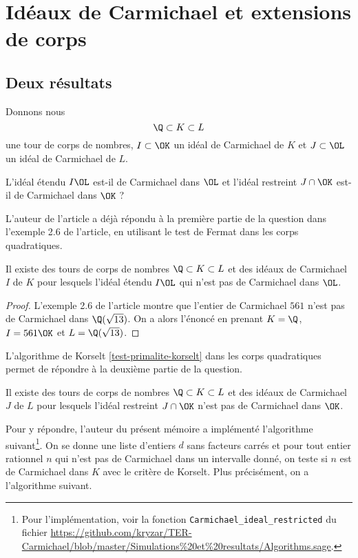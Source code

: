 \section{Idéaux de Carmichael et extensions de corps}

\subsection{Deux résultats}

Donnons nous \[\Q\subset K \subset L\] une tour de corps de nombres, $I\subset \OK$ un idéal de Carmichael de $K$ et $J \subset \OL$ un idéal de Carmichael de $L$. 

\begin{question}
	L'idéal étendu $I\OL$ est-il de Carmichael dans $\OL$ et l'idéal restreint $J\cap\OK$ est-il de Carmichael dans $\OK$ ? 
\end{question}

L'auteur de l'article a déjà répondu à la première partie de la question dans l'exemple 2.6 de l'article, en utilisant le test de Fermat dans les corps quadratiques.

\begin{proposition}\label{premier-ce}
	Il existe des tours de corps de nombres $\Q\subset K \subset L$ et des idéaux de Carmichael $I$ de $K$ pour lesquels l'idéal étendu $I\OL$ qui n'est pas de Carmichael dans $\OL$.
\end{proposition}

\begin{proof}
	L'exemple 2.6 de l'article montre que l'entier de Carmichael $561$ n'est pas de Carmichael dans $\Q(\sqrt{13})$. On a alors l'énoncé en prenant $K = \Q$, $I = 561\OK$ et $L = \Q(\sqrt{13})$.
\end{proof}

L'algorithme de Korselt \ref{test-primalite-korselt} dans les corps quadratiques permet de répondre à la deuxième partie de la question. 

\begin{proposition}\label{deuxieme-ce}
	Il existe des tours de corps de nombres $\Q\subset K \subset L$ et des idéaux de Carmichael $J$ de $L$ pour lesquels l'idéal restreint $J\cap \OK$ n'est pas de Carmichael dans $\OK$.
\end{proposition}

Pour y répondre, l'auteur du présent mémoire a implémenté l'algorithme suivant\footnote{Pour l'implémentation, voir la fonction \texttt{Carmichael\_ideal\_restricted} du fichier \url{https://github.com/kryzar/TER-Carmichael/blob/master/Simulations\%20et\%20resultats/Algorithms.sage}.}. On se donne une liste d'entiers $d$ sans facteurs carrés et pour tout entier rationnel $n$ qui n'est pas de Carmichael dans un intervalle donné, on teste si $n$ est de Carmichael dans $K$ avec le critère de Korselt. Plus précisément, on a l'algorithme suivant.


